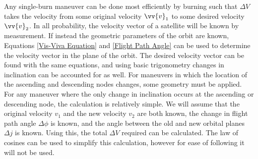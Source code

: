 \documentclass{article}
\begin{document}
Any single-burn maneuver can be done most efficiently by burning such that $\Delta V$ takes the velocity from some original velocity $\vv{v}_1$ to some desired velocity $\vv{v}_2$. In all probability, the velocity vector of a satellite will be known by measurement. If instead the geometric parameters of the orbit are known, Equations \eqref{Vis-Viva Equation} and \eqref{Flight Path Angle} can be used to determine the velocity vector in the plane of the orbit. The desired velocity vector can be found with the same equations, and using basic trigonometry changes in inclination can be accounted for as well. For maneuvers in which the location of the ascending and descending nodes changes, some geometry must be applied. For any maneuver where the only change in inclination occurs at the ascending or descending node, the calculation is relatively simple. We will assume that the original velocity $v_1$ and the new velocity $v_2$ are both known, the change in flight path angle $\Delta \phi$ is known, and the angle between the old and new orbital planes $\Delta j$ is known. Using this, the total $\Delta V$ required can be calculated. The law of cosines can be used to simplify this calculation, however for ease of following it will not be used.
\end{document}
